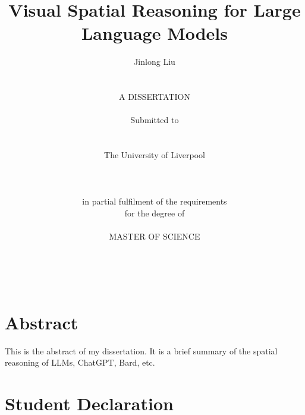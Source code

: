\documentclass[twocolumn,11pt]{report}
\begin{document}



\thispagestyle{empty}  %

\title{\LARGE
Visual Spatial Reasoning for Large Language Models}

\author{Jinlong Liu
\\    \\    \\
A DISSERTATION
\\    \\
Submitted to 
\\    \\    \\ 
The University of Liverpool
\\    \\
\\    \\
in partial fulfilment of the requirements
\\
for the degree of 
\\     \\
MASTER OF SCIENCE
\\     \\    \\    \\
}


\date{}


\maketitle
\onecolumn

\chapter*{\center Abstract}

This is the abstract of my dissertation.  It is a brief summary of the spatial reasoning of LLMs, ChatGPT, Bard, etc.

\newpage



\chapter*{\center Student Declaration} 
\end{document}
